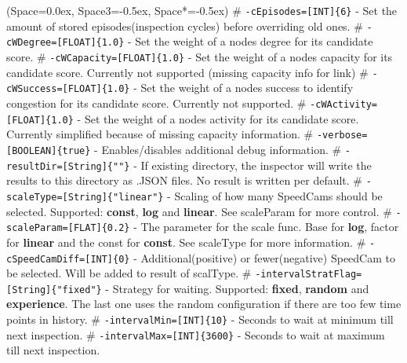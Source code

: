 \documentclass[thesis.tex]{subfiles}
\begin{document}
\begin{easylist}[itemize]
	\ListProperties(Space=0.0ex, Space3=-0.5ex, Space*=-0.5ex)
	# {\lstinline|-cEpisodes=[INT]{6}|} - Set the amount of stored episodes(inspection cycles) before overriding old ones.	
	# {\lstinline|-cWDegree=[FLOAT]{1.0}|} - Set the weight of a nodes degree for its candidate score.
	# {\lstinline|-cWCapacity=[FLOAT]{1.0}|} - Set the weight of a nodes capacity for its candidate score. Currently not supported (missing capacity info for link)
	# {\lstinline|-cWSuccess=[FLOAT]{1.0}|} - Set the weight of a nodes success to identify congestion for its candidate score. Currently not supported.
	# {\lstinline|-cWActivity=[FLOAT]{1.0}|} - Set the weight of a nodes activity for its candidate score. Currently simplified because of missing capacity information.
	# {\lstinline|-verbose=[BOOLEAN]{true}|} - Enables/disables additional debug information.
	# {\lstinline|-resultDir=[String]{""}|} - If existing directory, the inspector will write the results to this directory as .JSON files. No result is written per default.
	# {\lstinline|-scaleType=[String]{"linear"}|} - Scaling of how many SpeedCams should be selected. Supported: \textbf{const}, \textbf{log} and \textbf{linear}. See scaleParam for more control.
	# {\lstinline|-scaleParam=[FLAT]{0.2}|} - The parameter for the scale func. Base for \textbf{log}, factor for \textbf{linear} and the const for \textbf{const}. See scaleType for more information.
	# {\lstinline|-cSpeedCamDiff=[INT]{0}|} - Additional(positive) or fewer(negative) SpeedCam to be selected. Will be added to result of scalType.
	# {\lstinline|-intervalStratFlag=[String]{"fixed"}|} - Strategy for waiting. Supported: \textbf{fixed}, \textbf{random} and \textbf{experience}. The last one uses the random configuration if there are too few time points in history.
	# {\lstinline|-intervalMin=[INT]{10}|} - Seconds to wait at minimum till next inspection.
	# {\lstinline|-intervalMax=[INT]{3600}|} - Seconds to wait at maximum till next inspection.
\end{easylist}
\end{document}
